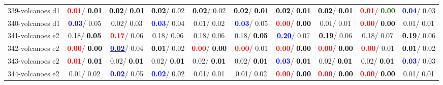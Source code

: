 \begin{table}[h]
\begin{center}
{\begin{tabular}{lc|c|c|c|c|c|c|c|c}
339-volcanoes d1 & \textcolor{red}{\textbf{  0.01}}/\textcolor{black}{\textbf{  0.01}} & \textcolor{black}{\textbf{  0.02}}/\textcolor{black}{\textbf{  0.01}} & \textcolor{black}{\textbf{  0.02}}/  0.02 & \textcolor{black}{\textbf{  0.02}}/  0.02 & \textcolor{black}{\textbf{  0.02}}/\textcolor{black}{\textbf{  0.01}} & \textcolor{black}{\textbf{  0.02}}/\textcolor{black}{\textbf{  0.01}} & \textcolor{black}{\textbf{  0.02}}/\textcolor{black}{\textbf{  0.01}} & \textcolor{red}{\textbf{  0.01}}/\textcolor{darkgreen}{\textbf{  0.00}} & \underline{\textcolor{blue}{\textbf{  0.04}}}/  0.03 \\
340-volcanoes d1 & \textcolor{blue}{\textbf{  0.03}}/  0.05 &   0.02/  0.03 & \textcolor{blue}{\textbf{  0.03}}/  0.04 &   0.01/  0.02 & \textcolor{blue}{\textbf{  0.03}}/  0.05 & \textcolor{red}{\textbf{  0.00}}/\textcolor{black}{\textbf{  0.00}} &   0.01/  0.01 & \textcolor{red}{\textbf{  0.00}}/\textcolor{black}{\textbf{  0.00}} &   0.01/  0.01 \\
341-volcanoes e2 &   0.18/\textcolor{black}{\textbf{  0.05}} & \textcolor{red}{\textbf{  0.17}}/  0.06 &   0.18/  0.06 &   0.18/  0.06 &   0.18/\textcolor{black}{\textbf{  0.05}} & \underline{\textcolor{blue}{\textbf{  0.20}}}/  0.07 & \textcolor{black}{\textbf{  0.19}}/  0.06 &   0.18/  0.07 & \textcolor{black}{\textbf{  0.19}}/  0.06 \\ \hline
342-volcanoes e2 & \textcolor{red}{\textbf{  0.00}}/\textcolor{black}{\textbf{  0.00}} & \underline{\textcolor{blue}{\textbf{  0.02}}}/  0.04 & \textcolor{black}{\textbf{  0.01}}/  0.02 & \textcolor{red}{\textbf{  0.00}}/\textcolor{black}{\textbf{  0.00}} & \textcolor{red}{\textbf{  0.00}}/  0.01 & \textcolor{red}{\textbf{  0.00}}/\textcolor{black}{\textbf{  0.00}} & \textcolor{red}{\textbf{  0.00}}/\textcolor{black}{\textbf{  0.00}} & \textcolor{red}{\textbf{  0.00}}/  0.01 & \textcolor{black}{\textbf{  0.01}}/  0.02 \\
343-volcanoes e2 & \textcolor{red}{\textbf{  0.01}}/\textcolor{black}{\textbf{  0.01}} &   0.02/\textcolor{black}{\textbf{  0.01}} &   0.02/\textcolor{black}{\textbf{  0.01}} &   0.02/\textcolor{black}{\textbf{  0.01}} &   0.02/\textcolor{black}{\textbf{  0.01}} & \textcolor{blue}{\textbf{  0.03}}/\textcolor{black}{\textbf{  0.01}} &   0.02/\textcolor{black}{\textbf{  0.01}} &   0.02/\textcolor{black}{\textbf{  0.01}} & \textcolor{blue}{\textbf{  0.03}}/  0.03 \\
344-volcanoes e2 &   0.01/  0.02 & \textcolor{blue}{\textbf{  0.02}}/  0.05 & \textcolor{blue}{\textbf{  0.02}}/  0.02 &   0.01/  0.01 &   0.01/  0.02 & \textcolor{red}{\textbf{  0.00}}/\textcolor{black}{\textbf{  0.00}} & \textcolor{red}{\textbf{  0.00}}/\textcolor{black}{\textbf{  0.00}} & \textcolor{red}{\textbf{  0.00}}/\textcolor{black}{\textbf{  0.00}} &   0.01/  0.01 \\

\end{tabular}}
\end{center}
\end{table}
